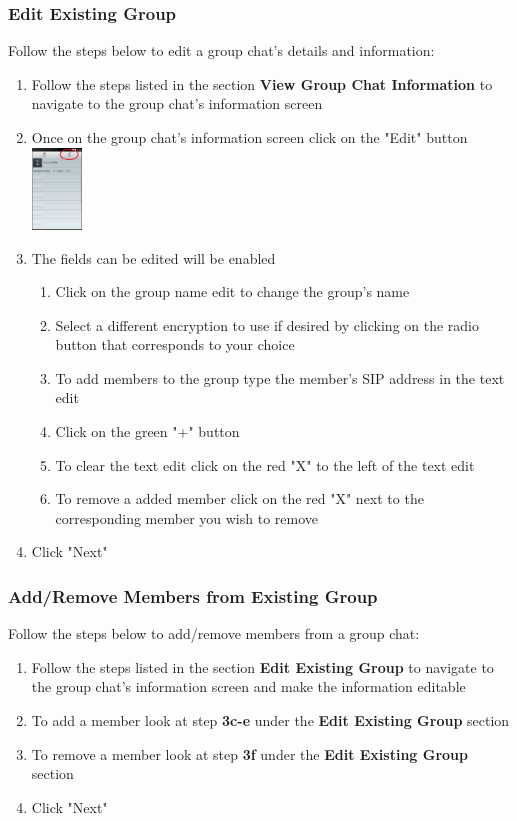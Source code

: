 \documentclass[11pt]{article}
\begin{document}
\subsubsection{Edit Existing Group}  \label{edit}
Follow the steps below to edit a group chat's details and information:
\begin{enumerate}
\item Follow the steps listed in the section \textbf{View Group Chat Information} to navigate to the group chat's information screen
\item Once on the group chat's information screen click on the "Edit" button\\
\includegraphics[width=50px]{images/groupchatInfoEdit.png}
\item The fields can be edited will be enabled
\begin{enumerate}
\item Click on the group name edit to change the group's name
\item Select a different encryption to use if desired by clicking on the radio button that corresponds to your choice
\item To add members to the group type the member's SIP address in the text edit
\item Click on the green "+" button
\item To clear the text edit click on the red "X" to the left of the text edit
\item To remove a added member click on the red "X" next to the corresponding member you wish to remove
\end{enumerate}
\item Click "Next"
\end{enumerate}


\subsubsection{Add/Remove Members from Existing Group}  \label{add}
Follow the steps below to add/remove members from a group chat:
\begin{enumerate}
\item Follow the steps listed in the section \textbf{Edit Existing Group} to navigate to the group chat's information screen and make the information editable
\item To add a member look at step \textbf{3c-e} under the \textbf{Edit Existing Group} section
\item To remove a member look at step \textbf{3f} under the \textbf{Edit Existing Group} section
\item Click "Next"
\end{enumerate}
\end{document}
